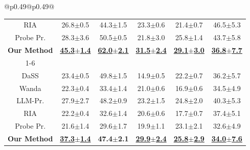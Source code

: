 \begin{table}[!t]
\begin{tabular}{@{}p{}@{}p{}@{}}
{\begin{tabular}{c c c c c c}
RIA & 26.8{\scriptsize$\pm$0.5} & 44.3{\scriptsize$\pm$1.5} & 23.3{\scriptsize$\pm$0.6} & 21.4{\scriptsize$\pm$0.7} & 46.5{\scriptsize$\pm$5.3} \\
Probe Pr. & 28.3{\scriptsize$\pm$3.6} & 50.5{\scriptsize$\pm$0.5} & 21.8{\scriptsize$\pm$3.0} & 25.8{\scriptsize$\pm$1.4} & 43.7{\scriptsize$\pm$5.8} \\
\rowcolor{icmlblue} \textbf{Our Method} & \textbf{\underline{45.3{\scriptsize$\pm$1.4}}} & \textbf{\underline{62.0{\scriptsize$\pm$2.1}}} & \textbf{\underline{31.5{\scriptsize$\pm$2.4}}} & \textbf{\underline{29.1{\scriptsize$\pm$3.0}}} & \textbf{\underline{36.8{\scriptsize$\pm$7.7}}} \\
\cmidrule(lr){1-6}
\rowcolor{lightgray} \multicolumn{6}{c}{\rule{0pt}{2.2ex}\textbf{Heavy Pruning}\rule[-0.8ex]{0pt}{0pt}} \\
DaSS & 23.4{\scriptsize$\pm$0.5} & 49.8{\scriptsize$\pm$1.5} & 14.9{\scriptsize$\pm$0.5} & 22.2{\scriptsize$\pm$0.7} & 36.2{\scriptsize$\pm$5.7} \\
Wanda & 22.3{\scriptsize$\pm$0.4} & 33.4{\scriptsize$\pm$1.4} & 21.0{\scriptsize$\pm$0.6} & 16.9{\scriptsize$\pm$0.6} & 34.5{\scriptsize$\pm$4.9} \\
LLM-Pr. & 27.9{\scriptsize$\pm$2.7} & 48.2{\scriptsize$\pm$0.9} & 23.2{\scriptsize$\pm$1.5} & 24.8{\scriptsize$\pm$2.0} & 40.3{\scriptsize$\pm$5.3} \\
RIA & 22.2{\scriptsize$\pm$0.4} & 32.6{\scriptsize$\pm$1.4} & 20.6{\scriptsize$\pm$0.6} & 17.7{\scriptsize$\pm$0.7} & 37.4{\scriptsize$\pm$5.1} \\
Probe Pr. & 21.6{\scriptsize$\pm$1.4} & 29.6{\scriptsize$\pm$1.7} & 19.9{\scriptsize$\pm$1.1} & 23.1{\scriptsize$\pm$2.1} & 32.6{\scriptsize$\pm$4.9} \\
\rowcolor{icmlblue} \textbf{Our Method} & \textbf{\underline{37.3{\scriptsize$\pm$1.4}}} & \textbf{47.4{\scriptsize$\pm$2.1}} & \textbf{\underline{29.9{\scriptsize$\pm$2.4}}} & \textbf{\underline{25.8{\scriptsize$\pm$2.9}}} & \textbf{\underline{34.0{\scriptsize$\pm$7.6}}} \\

\end{tabular}}
\end{tabular}
\end{table}
